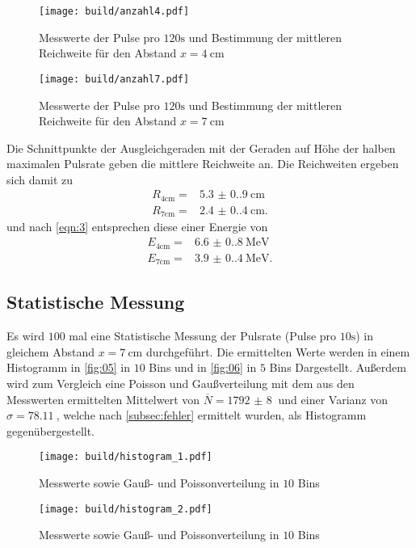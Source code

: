 \begin{figure}[H]
  \centering
  \caption{Messwerte der Pulse pro $120\unit{\second}$ und Bestimmung der mittleren Reichweite für den Abstand $x = \qty{4}{\centi\meter}$}
  \label{fig:13}
  \texttt{[image: build/anzahl4.pdf]}
\end{figure}

\begin{figure}[H]
  \centering
  \caption{Messwerte der Pulse pro $120\unit{\second}$ und Bestimmung der mittleren Reichweite für den Abstand $x = \qty{7}{\centi\meter}$}
  \label{fig:14}
  \texttt{[image: build/anzahl7.pdf]}
\end{figure}
\noindent Die Schnittpunkte der Ausgleichgeraden mit der Geraden auf Höhe der
halben maximalen Pulsrate geben die mittlere Reichweite an. Die Reichweiten
ergeben sich damit zu 
\begin{align}
  R_\text{4cm} = &\qty{5.3(0.9)}{\centi\meter} \\
  R_\text{7cm} = &\qty{2.4(0.4)}{\centi\meter}.
\end{align}
und nach \autoref{eqn:3} entsprechen diese einer Energie von
\begin{align}
  E_\text{4cm} = &\qty{6.6(0.8)}{\mega\electronvolt} \\
  E_\text{7cm} = &\qty{3.9(0.4)}{\mega\electronvolt}.
\end{align}

\subsection{Statistische Messung}
Es wird $100$ mal eine Statistische Messung der Pulsrate (Pulse pro $10\unit{\second}$) in gleichem Abstand $x=\qty{7}{\centi\meter}$ 
durchgeführt. Die ermittelten Werte werden in einem Histogramm in \autoref{fig:05} in $10$ Bins und in \autoref{fig:06} in $5$ Bins Dargestellt. 
Außerdem wird zum Vergleich eine Poisson und Gaußverteilung mit dem aus den Messwerten ermittelten Mittelwert von $\overline{N} = \qty{1792(8)}{}$ und einer Varianz von 
$\sigma = \qty{78.11}{}$, welche nach \autoref{subsec:fehler} ermittelt wurden, 
als Histogramm gegenübergestellt.
\begin{figure}[H]
  \centering
  \caption{Messwerte sowie Gauß- und Poissonverteilung in $10$ Bins}
  \label{fig:05}
  \texttt{[image: build/histogram\_1.pdf]}
\end{figure}
\begin{figure}[H]
  \centering
  \caption{Messwerte sowie Gauß- und Poissonverteilung in $10$ Bins}
  \label{fig:06}
  \texttt{[image: build/histogram\_2.pdf]}
\end{figure}